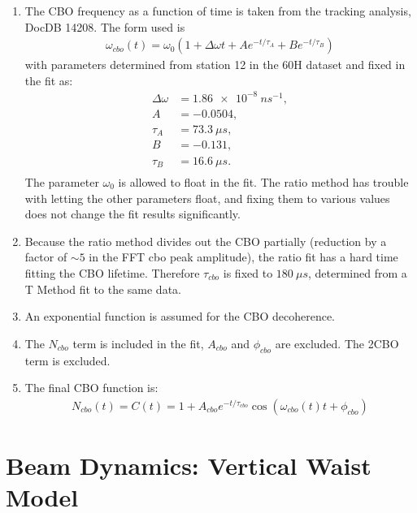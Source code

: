 \begin{enumerate}
	\item{The CBO frequency as a function of time is taken from the tracking analysis, DocDB 14208. The form used is 
		\begin{gather*}
			\omega_{cbo}(t) = \omega_{0}(1 + \Delta\omega t + A e^{-t/\tau_{A}} + B e^{-t/\tau_{B}})
		\end{gather*}
	with parameters determined from station 12 in the 60H dataset and fixed in the fit as:
		\begin{equation*}	
		\begin{aligned}
		 	\Delta\omega &= \SI{1.86e-8}{ns^{-1}}, \\
		 	A &= -0.0504, \\
		 	\tau_{A} &= \SI{73.3}{\mu s}, \\
		 	B &= -0.131, \\
		 	\tau_{B} &= \SI{16.6}{\mu s}. \\
		\end{aligned}
		\end{equation*}
	The parameter $\omega_{0}$ is allowed to float in the fit. The ratio method has trouble with letting the other parameters float, and fixing them to various values does not change the fit results significantly.}
	\item{Because the ratio method divides out the CBO partially (reduction by a factor of $\sim5$ in the FFT cbo peak amplitude), the ratio fit has a hard time fitting the CBO lifetime. Therefore $\tau_{cbo}$ is fixed to $\SI{180}{\mu s}$, determined from a T Method fit to the same data.}
	\item{An exponential function is assumed for the CBO decoherence.}
	\item{The $N_{cbo}$ term is included in the fit, $A_{cbo}$ and $\phi_{cbo}$ are excluded. The 2CBO term is excluded.}
	\item{The final CBO function is:
		\begin{gather*}
				N_{cbo}(t) = C(t) = 1 + A_{cbo} e^{-t/\tau_{cbo}} \cos(\omega_{cbo}(t)t + \phi_{cbo})
		\end{gather*}
	}
\end{enumerate}


\section{Beam Dynamics: Vertical Waist Model}

